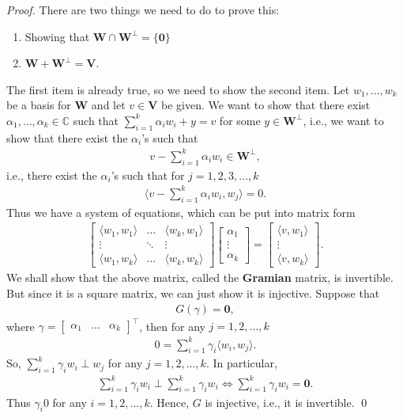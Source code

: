 \documentclass{article}
\theoremstyle{definition}
\newcommand{\C}{\mathbb{C}}
\newcommand{\V}{\mathbf{V}}
\newcommand{\W}{\mathbf{W}}
\newcommand{\la}{\langle}
\newcommand{\ra}{\rangle}
\begin{document}
\begin{proof}
	There are two things we need to do to prove this:
	\begin{enumerate}
		\item Showing that $\W \cap \W^\perp = \{ \mathbf{0} \}$
		\item $\W + \W^\perp = \V$.
	\end{enumerate}

	The first item is already true, so we need to show the second item. Let $w_1,\dots, w_k$ be a basis for $\W$ and let $v\in \V$ be given. We want to show that there exist $\alpha_1, \dots, \alpha_k \in \C$ such that $\sum^k_{i=1} \alpha_i w_i + y = v$ for some $y\in \W^\perp$, i.e., we want to show that there exist the $\alpha_i$'s such that 
	\begin{align*}
		v - \sum^k_{i=1}\alpha_iw_i \in \W^\perp,
	\end{align*}
	i.e., there exist the $\alpha_i$'s such that for $j = 1,2,3,\dots,k$
	\begin{align*}
	\la v - \sum^k_{i=1}\alpha_iw_i, w_j \ra = 0.
	\end{align*}
	Thus we have a system of equations, which can be put into matrix form
	\begin{align*}
	\begin{bmatrix}
	\la w_1, w_1 \ra & \dots & \la w_k, w_1 \ra\\
	\vdots& \ddots & \vdots\\
	\la w_1,w_k \ra&\dots & \la w_k,w_k\ra
	\end{bmatrix}
	\begin{bmatrix}
	\alpha_1\\\vdots\\\alpha_k
	\end{bmatrix}
	=
	\begin{bmatrix}
	\la v,w_1 \ra \\ \vdots \\ \la v,w_k \ra
	\end{bmatrix}.
	\end{align*}
	We shall show that the above matrix, called the \textbf{Gramian} matrix, is invertible. But since it is a square matrix, we can just show it is injective. Suppose that 
	\begin{align*}
	G(\gamma) = \mathbf{0},
	\end{align*}
	where $\gamma = \begin{bmatrix}
	\alpha_1&\dots&\alpha_k
	\end{bmatrix}^\top$, then for any $j = 1,2,\dots,k$
	\begin{align*}
	0 = \sum^k_{i=1}\gamma_i \la w_i, w_j \ra.
	\end{align*}
	So, $\sum^k_{i=1}\gamma_iw_i \perp w_j$ for any $j=1,2,\dots,k$. In particular, 
	\begin{align*}
	\sum^k_{i=1}\gamma_iw_i \perp \sum^k_{i=1}\gamma_iw_i \iff \sum^k_{i=1}\gamma_iw_i = \mathbf{0}. 
	\end{align*}
	Thus $\gamma_i 0$ for any $i=1,2,\dots,k$. Hence, $G$ is injective, i.e., it is invertible. \qed
	

	
\end{proof}
\end{document}
